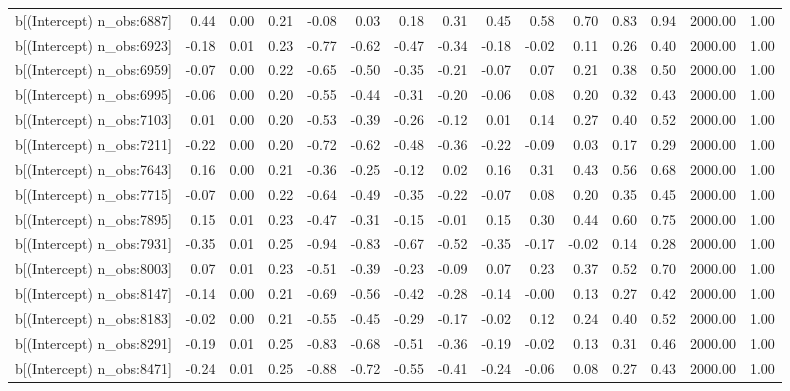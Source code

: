 \begin{table}[ht]
\begin{tabular}{rrrrrrrrrrrrrrr}
  b[(Intercept) n\_obs:6887] & 0.44 & 0.00 & 0.21 & -0.08 & 0.03 & 0.18 & 0.31 & 0.45 & 0.58 & 0.70 & 0.83 & 0.94 & 2000.00 & 1.00 \\ 
  b[(Intercept) n\_obs:6923] & -0.18 & 0.01 & 0.23 & -0.77 & -0.62 & -0.47 & -0.34 & -0.18 & -0.02 & 0.11 & 0.26 & 0.40 & 2000.00 & 1.00 \\ 
  b[(Intercept) n\_obs:6959] & -0.07 & 0.00 & 0.22 & -0.65 & -0.50 & -0.35 & -0.21 & -0.07 & 0.07 & 0.21 & 0.38 & 0.50 & 2000.00 & 1.00 \\ 
  b[(Intercept) n\_obs:6995] & -0.06 & 0.00 & 0.20 & -0.55 & -0.44 & -0.31 & -0.20 & -0.06 & 0.08 & 0.20 & 0.32 & 0.43 & 2000.00 & 1.00 \\ 
  b[(Intercept) n\_obs:7103] & 0.01 & 0.00 & 0.20 & -0.53 & -0.39 & -0.26 & -0.12 & 0.01 & 0.14 & 0.27 & 0.40 & 0.52 & 2000.00 & 1.00 \\ 
  b[(Intercept) n\_obs:7211] & -0.22 & 0.00 & 0.20 & -0.72 & -0.62 & -0.48 & -0.36 & -0.22 & -0.09 & 0.03 & 0.17 & 0.29 & 2000.00 & 1.00 \\ 
  b[(Intercept) n\_obs:7643] & 0.16 & 0.00 & 0.21 & -0.36 & -0.25 & -0.12 & 0.02 & 0.16 & 0.31 & 0.43 & 0.56 & 0.68 & 2000.00 & 1.00 \\ 
  b[(Intercept) n\_obs:7715] & -0.07 & 0.00 & 0.22 & -0.64 & -0.49 & -0.35 & -0.22 & -0.07 & 0.08 & 0.20 & 0.35 & 0.45 & 2000.00 & 1.00 \\ 
  b[(Intercept) n\_obs:7895] & 0.15 & 0.01 & 0.23 & -0.47 & -0.31 & -0.15 & -0.01 & 0.15 & 0.30 & 0.44 & 0.60 & 0.75 & 2000.00 & 1.00 \\ 
  b[(Intercept) n\_obs:7931] & -0.35 & 0.01 & 0.25 & -0.94 & -0.83 & -0.67 & -0.52 & -0.35 & -0.17 & -0.02 & 0.14 & 0.28 & 2000.00 & 1.00 \\ 
  b[(Intercept) n\_obs:8003] & 0.07 & 0.01 & 0.23 & -0.51 & -0.39 & -0.23 & -0.09 & 0.07 & 0.23 & 0.37 & 0.52 & 0.70 & 2000.00 & 1.00 \\ 
  b[(Intercept) n\_obs:8147] & -0.14 & 0.00 & 0.21 & -0.69 & -0.56 & -0.42 & -0.28 & -0.14 & -0.00 & 0.13 & 0.27 & 0.42 & 2000.00 & 1.00 \\ 
  b[(Intercept) n\_obs:8183] & -0.02 & 0.00 & 0.21 & -0.55 & -0.45 & -0.29 & -0.17 & -0.02 & 0.12 & 0.24 & 0.40 & 0.52 & 2000.00 & 1.00 \\ 
  b[(Intercept) n\_obs:8291] & -0.19 & 0.01 & 0.25 & -0.83 & -0.68 & -0.51 & -0.36 & -0.19 & -0.02 & 0.13 & 0.31 & 0.46 & 2000.00 & 1.00 \\ 
  b[(Intercept) n\_obs:8471] & -0.24 & 0.01 & 0.25 & -0.88 & -0.72 & -0.55 & -0.41 & -0.24 & -0.06 & 0.08 & 0.27 & 0.43 & 2000.00 & 1.00 \\ 

\end{tabular}
\end{table}

